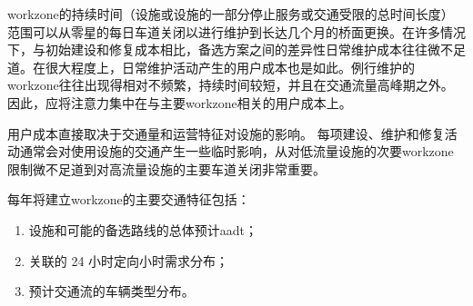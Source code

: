 \gls*{workzone}的持续时间（设施或设施的一部分停止服务或交通受限的总时间长度）范围可以从零星的每日车道关闭以进行维护到长达几个月的桥面更换。在许多情况下，与初始建设和修复成本相比，备选方案之间的差异性日常维护成本往往微不足道。在很大程度上，日常维护活动产生的用户成本也是如此。例行维护的\gls*{workzone}往往出现得相对不频繁，持续时间较短，并且在交通流量高峰期之外。 因此，应将注意力集中在与主要\gls*{workzone}相关的用户成本上。

用户成本直接取决于交通量和运营特征对设施的影响。 每项建设、维护和修复活动通常会对使用设施的交通产生一些临时影响，从对低流量设施的次要\gls*{workzone}限制微不足道到对高流量设施的主要车道关闭非常重要。

每年将建立\gls*{workzone}的主要交通特征包括：
\begin{enumerate}
  \item 设施和可能的备选路线的总体预计\acrfull{aadt}；
  \item 关联的 24 小时定向小时需求分布；
  \item 预计交通流的车辆类型分布。
\end{enumerate}

